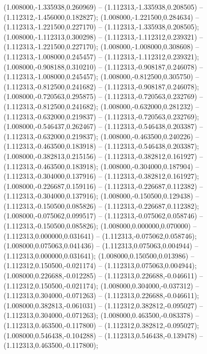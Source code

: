  (1.008000,-1.335938,0.260969) -- (1.112313,-1.335938,0.208505) -- (1.112312,-1.456000,0.182827);
 (1.008000,-1.221500,0.284634) -- (1.112313,-1.221500,0.227170) -- (1.112313,-1.335938,0.208505);
 (1.008000,-1.112313,0.300298) -- (1.112313,-1.112312,0.239321) -- (1.112313,-1.221500,0.227170);
 (1.008000,-1.008000,0.308608) -- (1.112313,-1.008000,0.245457) -- (1.112313,-1.112312,0.239321);
 (1.008000,-0.908188,0.310210) -- (1.112313,-0.908187,0.246078) -- (1.112313,-1.008000,0.245457);
 (1.008000,-0.812500,0.305750) -- (1.112313,-0.812500,0.241682) -- (1.112313,-0.908187,0.246078);
 (1.008000,-0.720563,0.295875) -- (1.112313,-0.720563,0.232769) -- (1.112313,-0.812500,0.241682);
 (1.008000,-0.632000,0.281232) -- (1.112313,-0.632000,0.219837) -- (1.112313,-0.720563,0.232769);
 (1.008000,-0.546437,0.262467) -- (1.112313,-0.546438,0.203387) -- (1.112313,-0.632000,0.219837);
 (1.008000,-0.463500,0.240226) -- (1.112313,-0.463500,0.183918) -- (1.112313,-0.546438,0.203387);
 (1.008000,-0.382813,0.215156) -- (1.112313,-0.382812,0.161927) -- (1.112313,-0.463500,0.183918);
 (1.008000,-0.304000,0.187904) -- (1.112313,-0.304000,0.137916) -- (1.112313,-0.382812,0.161927);
 (1.008000,-0.226687,0.159116) -- (1.112313,-0.226687,0.112382) -- (1.112313,-0.304000,0.137916);
 (1.008000,-0.150500,0.129438) -- (1.112313,-0.150500,0.085826) -- (1.112313,-0.226687,0.112382);
 (1.008000,-0.075062,0.099517) -- (1.112313,-0.075062,0.058746) -- (1.112313,-0.150500,0.085826);
 (1.008000,0.000000,0.070000) -- (1.112313,0.000000,0.031641) -- (1.112313,-0.075062,0.058746);
 (1.008000,0.075063,0.041436) -- (1.112313,0.075063,0.004944) -- (1.112313,0.000000,0.031641);
 (1.008000,0.150500,0.013986) -- (1.112312,0.150500,-0.021174) -- (1.112313,0.075063,0.004944);
 (1.008000,0.226688,-0.012285) -- (1.112313,0.226688,-0.046611) -- (1.112312,0.150500,-0.021174);
 (1.008000,0.304000,-0.037312) -- (1.112313,0.304000,-0.071263) -- (1.112313,0.226688,-0.046611);
 (1.008000,0.382813,-0.061031) -- (1.112312,0.382812,-0.095027) -- (1.112313,0.304000,-0.071263);
 (1.008000,0.463500,-0.083378) -- (1.112313,0.463500,-0.117800) -- (1.112312,0.382812,-0.095027);
 (1.008000,0.546438,-0.104288) -- (1.112313,0.546438,-0.139478) -- (1.112313,0.463500,-0.117800);
